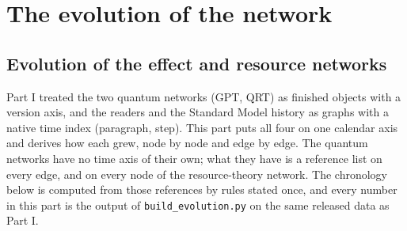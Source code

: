 \part{The evolution of the network}\label{part:evolution}
\chapter{Evolution of the effect and resource networks}\label{ch:evoE}

Part I treated the two quantum networks (GPT, QRT) as finished objects with a version axis, and the readers and the Standard Model history as graphs with a native time index (paragraph, step). This part puts all four on one calendar axis and derives how each grew, node by node and edge by edge. The quantum networks have no time axis of their own; what they have is a reference list on every edge, and on every node of the resource-theory network. The chronology below is computed from those references by rules stated once, and every number in this part is the output of \texttt{build\_evolution.py} on the same released data as Part I.

